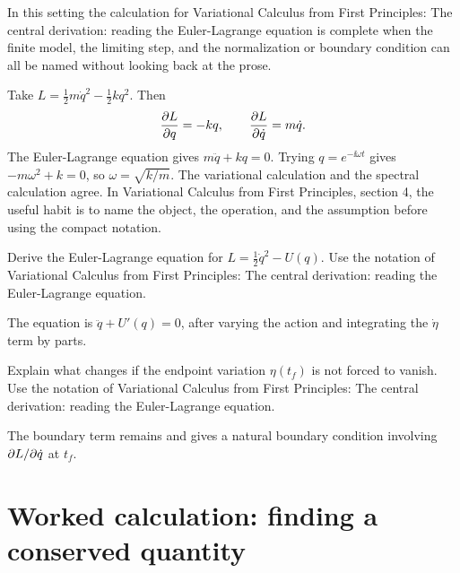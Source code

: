 In this setting the calculation for Variational Calculus from First Principles: The central derivation: reading the Euler-Lagrange equation is complete when the finite model, the limiting step, and the normalization or boundary condition can all be named without looking back at the prose.




\begin{example}
Take \(L=\frac12m\dot q^2-\frac12kq^2\).  Then
\[
  \frac{\partial L}{\partial q}=-kq,\qquad \frac{\partial L}{\partial\dot q}=m\dot q.
\]
The Euler-Lagrange equation gives \(m\ddot q+kq=0\).  Trying \(q=e^{-\ii\omega t}\) gives \(-m\omega^2+k=0\), so \(\omega=\sqrt{k/m}\).  The variational calculation and the spectral calculation agree.  In Variational Calculus from First Principles, section 4, the useful habit is to name the object, the operation, and the assumption before using the compact notation.
\end{example}



\begin{exercise}
Derive the Euler-Lagrange equation for \(L=\frac12\dot q^2-U(q)\).  Use the notation of Variational Calculus from First Principles: The central derivation: reading the Euler-Lagrange equation.
\begin{answer}
The equation is \(\ddot q+U'(q)=0\), after varying the action and integrating the \(\dot\eta\) term by parts.
\end{answer}
\end{exercise}

\begin{exercise}
Explain what changes if the endpoint variation \(\eta(t_f)\) is not forced to vanish.  Use the notation of Variational Calculus from First Principles: The central derivation: reading the Euler-Lagrange equation.
\begin{answer}
The boundary term remains and gives a natural boundary condition involving \(\partial L/\partial\dot q\) at \(t_f\).
\end{answer}
\end{exercise}



\section{Worked calculation: finding a conserved quantity}

